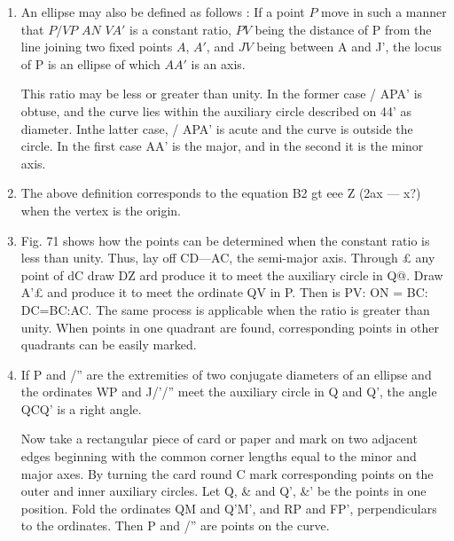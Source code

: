 \begin{enumerate}
\item An ellipse may also be defined as follows :
    If a point $P$ move in such a manner that $P/VP$  $AN$ $VA'$ is a constant
    ratio, $PV$ being the distance of P from the line joining two fixed points
    $A$, $A'$, and $JV$ being between A and J', the locus of P is an ellipse of
    which $AA'$ is an axis.



    This ratio may be less or greater than unity. In the former case / APA’ is
    obtuse, and the curve lies within the auxiliary circle described on 44’ as
    diameter. Inthe latter case, / APA’ is acute and the curve is outside the
    circle. In the first case AA’ is the major, and in the second it is the
    minor axis.


\item The above definition corresponds to the equation B2 gt eee Z (2ax — x?)
    when the vertex is the origin.



\item Fig. 71 shows how the points can be determined when the constant ratio is
    less than unity.  Thus, lay off CD—AC, the semi-major axis. Through £ any
    point of dC draw DZ ard produce it to meet the auxiliary circle in Q@. Draw
    A'£ and produce it to meet the ordinate QV in P. Then is PV: ON = BC:
    DC=BC:AC. The same process is applicable when the ratio is greater than
    unity. When points in one quadrant are found, corresponding points in other
    quadrants can be easily marked.

\item If P and /” are the extremities of two conjugate diameters of an ellipse
    and the ordinates WP and J/'/” meet the auxiliary circle in Q and Q’, the
    angle QCQ' is a right angle.

    Now take a rectangular piece of card or paper and mark on two adjacent edges
    beginning with the common corner lengths equal to the minor and major axes.
    By turning the card round C mark corresponding points on the outer and inner
    auxiliary circles.  Let Q, \& and Q’, \&’ be the points in one position.
    Fold the ordinates QM and Q’M’, and RP and FP’, perpendiculars to the
    ordinates.  Then P and /” are points on the curve.


\end{enumerate}
